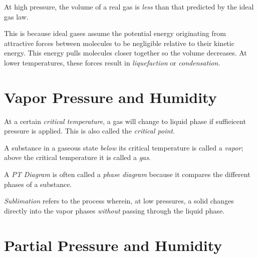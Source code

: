 \begin{remark}
    At high pressure, the volume of a real gas is \emph{less} than that predicted by the ideal gas law.
\end{remark}
\begin{explanation}
    This is because ideal gases assume the potential energy originating from attractive forces between molecules to be negligible relative to their kinetic energy. This energy pulls molecules closer together so the volume decreases. At lower temperatures, these forces result in \emph{liquefaction} or \emph{condensation}.
\end{explanation}

\section{Vapor Pressure and Humidity}

\begin{definition}
    At a certain \emph{critical temperature}, a gas will change to liquid phase if suffieicent pressure is applied. This is also called the \emph{critical point}.
\end{definition}
\begin{definition}
    A substance in a gaseous state \emph{below} its critical temperature is called a \emph{vapor}; above the critical temperature it is called a \emph{gas}.
\end{definition}
\begin{remark}
    A \emph{PT Diagram} is often called a \emph{phase diagram} because it compares the different phases of a substance.
\end{remark}
\begin{definition}[Sublimation]
    \emph{Sublimation} refers to the process wherein, at low pressures, a solid changes directly into the vapor phases \emph{without} passing through the liquid phase. 
\end{definition}

\section{Partial Pressure and Humidity}

